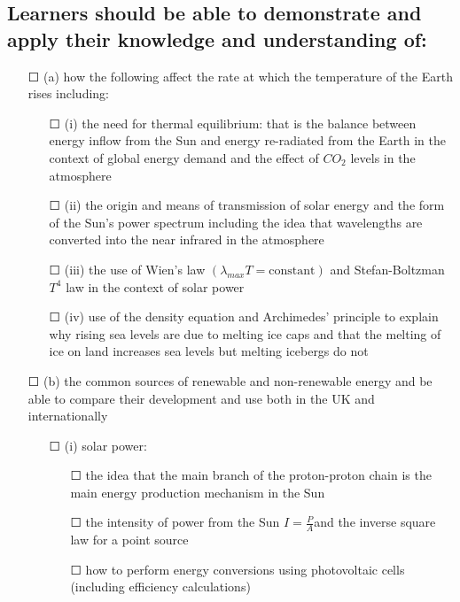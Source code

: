 \subsection*{Learners should be able to demonstrate and apply their knowledge and
	understanding of:}
\begin{itemize}
	\item[\Large{$\Square$}](a) how the following affect the rate at which the temperature of the Earth rises
	including:
	\begin{itemize}
		\item[\Large{$\Square$}](i) the need for thermal equilibrium: that is the balance between energy
		inflow from the Sun and energy re-radiated from the Earth in the
		context of global energy demand and the effect of \(CO_{2}\) levels in the
		atmosphere
		\item[\Large{$\Square$}](ii) the origin and means of transmission of solar energy and the form of
		the Sun’s power spectrum including the idea that wavelengths are converted into the near infrared in the atmosphere
		\item[\Large{$\Square$}](iii) the use of Wien’s law \((\lambda_{max} T = \text{constant})\) and Stefan-Boltzman \(T^{4}\) law in the context of solar power
		\item[\Large{$\Square$}](iv) use of the density equation and Archimedes’ principle to explain why
		rising sea levels are due to melting ice caps and that the melting of ice on land increases sea levels but melting icebergs do not 
		
	\end{itemize}
	\item[\Large{$\Square$}](b) the common sources of renewable and non-renewable energy and be able to
	compare their development and use both in the UK and internationally
	\begin{itemize}
		\item[\Large{$\Square$}](i) solar power:
		\begin{itemize}
			\item[\Large{$\Square$}] the idea that the main branch of the proton-proton chain is the
			main energy production mechanism in the Sun
			\item[\Large{$\Square$}] the intensity of power from the Sun \(I=\frac{P}{A} \)and the inverse square
			law for a point source
			\item[\Large{$\Square$}] how to perform energy conversions using photovoltaic cells
			(including efficiency calculations)
			

\end{itemize}
\end{itemize}
\end{itemize}
